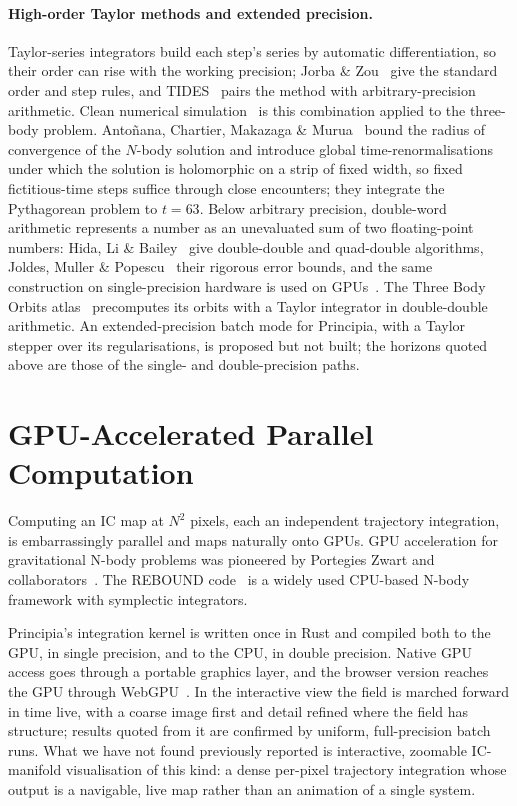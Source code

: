 \documentclass[11pt,a4paper]{article}
\begin{document}
\paragraph{High-order Taylor methods and extended precision.}
Taylor-series integrators build each step's series by automatic differentiation, so their order
can rise with the working precision; Jorba \& Zou~\cite{jorba2005} give the standard order and
step rules, and TIDES~\cite{abad2012} pairs the method with arbitrary-precision arithmetic.  Clean
numerical simulation~\cite{li2017} is this combination applied to the three-body problem.
Anto\~{n}ana, Chartier, Makazaga \& Murua~\cite{antonana2020} bound the radius of convergence of
the $N$-body solution and introduce global time-renormalisations under which the solution is
holomorphic on a strip of fixed width, so fixed fictitious-time steps suffice through close
encounters; they integrate the Pythagorean problem to $t = 63$.  Below arbitrary precision,
double-word arithmetic represents a number as an unevaluated sum of two floating-point numbers:
Hida, Li \& Bailey~\cite{hida2001} give double-double and quad-double algorithms, Joldes, Muller \&
Popescu~\cite{joldes2017} their rigorous error bounds, and the same construction on single-precision
hardware is used on GPUs~\cite{thall2006,joldes2016}.  The Three Body Orbits atlas~\cite{tbo2026}
precomputes its orbits with a Taylor integrator in double-double arithmetic.  An extended-precision
batch mode for Principia, with a Taylor stepper over its regularisations, is proposed but not
built; the horizons quoted above are those of the single- and double-precision paths.

\section{GPU-Accelerated Parallel Computation}

Computing an IC map at $N^2$ pixels, each an independent trajectory integration, is
embarrassingly parallel and maps naturally onto GPUs.  GPU acceleration for gravitational N-body
problems was pioneered by Portegies Zwart and collaborators~\cite{portegies2007}.  The REBOUND
code~\cite{rein2012} is a widely used CPU-based N-body framework with symplectic integrators.

Principia's integration kernel is written once in Rust and compiled both to the GPU, in single
precision, and to the CPU, in double precision.  Native GPU access goes through a portable
graphics layer, and the browser version reaches the GPU through WebGPU~\cite{webgpu2024}.  In the
interactive view the field is marched forward in time live, with a coarse image first and detail
refined where the field has structure; results quoted from it are confirmed by uniform,
full-precision batch runs.  What we have not found previously reported is interactive, zoomable
IC-manifold visualisation of this kind: a dense per-pixel trajectory integration whose output is a
navigable, live map rather than an animation of a single system.
\end{document}
